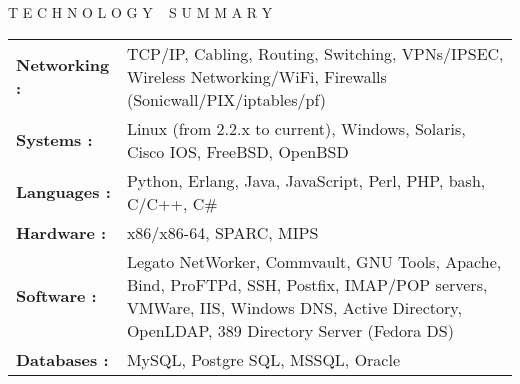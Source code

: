  

\begin{rubric}{T E C H N O L O G Y ~ S U M M A R Y}
	\begin{tabular}{>{\bfseries}l<{:}@{\hspace{5pt}}p{}}
		Networking & TCP/IP, Cabling, Routing, Switching, VPNs/IPSEC, Wireless Networking/WiFi, Firewalls (Sonicwall/PIX/iptables/pf)\\
		Systems & Linux (from 2.2.x to current), Windows, Solaris, Cisco IOS, FreeBSD, OpenBSD\\
		Languages & Python, Erlang, Java, JavaScript, Perl, PHP, bash, C/C++, C\#\\
		Hardware & x86/x86-64, SPARC, MIPS\\
		Software & Legato NetWorker, Commvault, GNU Tools, Apache, Bind, ProFTPd, SSH, Postfix, IMAP/POP servers, VMWare, IIS, Windows DNS, Active Directory, OpenLDAP, 389 Directory Server (Fedora DS)\\
		Databases & MySQL, Postgre SQL, MSSQL, Oracle\\
	\end{tabular}
\end{rubric}

